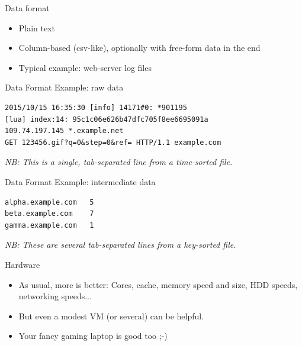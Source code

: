 \documentclass[handout]{beamer}
\begin{document}

\begin{frame}{Data format}

\begin{itemize}
\item Plain text
\item Column-based (csv-like), optionally with free-form data in the end
\item Typical example: web-server log files
\end{itemize}

\end{frame}


\begin{frame}[fragile]{Data Format Example: raw data}

\begin{verbatim}
2015/10/15 16:35:30 [info] 14171#0: *901195
[lua] index:14: 95c1c06e626b47dfc705f8ee6695091a
109.74.197.145 *.example.net
GET 123456.gif?q=0&step=0&ref= HTTP/1.1 example.com
\end{verbatim}
\textit{NB: This is a single, tab-separated line from a time-sorted file.}

\end{frame}


\begin{frame}[fragile]{Data Format Example: intermediate data}

\begin{verbatim}
alpha.example.com	5
beta.example.com	7
gamma.example.com	1
\end{verbatim}

\textit{NB: These are several tab-separated lines from a key-sorted file.}

\end{frame}


\begin{frame}{Hardware}

\begin{itemize}
\item As usual, more is better: Cores, cache, memory speed and size,
      HDD speeds, networking speeds...
\item But even a modest VM (or several) can be helpful.
\item Your fancy gaming laptop is good too ;-)
\end{itemize}

\end{frame}
\end{document}

